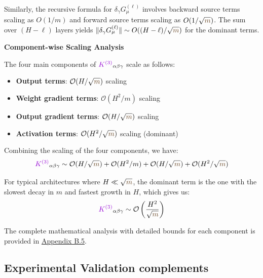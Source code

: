\documentclass[a4paper]{article}
\newcommand{\m}{\textcolor{weightcolor}{m}}
\theoremstyle{plain}
\theoremstyle{definition}
\theoremstyle{remark}
\begin{document}
Similarly, the recursive formula for $\delta_\gamma G^{(\ell)}_\mu$ involves backward source terms scaling as $O(1/m)$ and forward source terms scaling as $O(1/\sqrt{\m})$. The sum over $(H-\ell)$ layers yields $\|\delta_\gamma G^{(\ell)}_\mu\| \sim O((H-\ell)/\sqrt{\m})$ for the dominant terms.

\textbf{Component-wise Scaling Analysis}

The four main components of $\textcolor{k3color}{K^{(3)}}_{\alpha\beta\gamma}$ scale as follows:
\begin{itemize}
\item \textbf{Output terms}: $\mathcal{O}(H/\sqrt{\m})$ scaling
\item \textbf{Weight gradient terms}: $\mathcal{O}(H^2/m)$ scaling  
\item \textbf{Output gradient terms}: $\mathcal{O}(H/\sqrt{\m})$ scaling
\item \textbf{Activation terms}: $\mathcal{O}(H^2/\sqrt{\m})$ scaling (dominant)
\end{itemize}

Combining the scaling of the four components, we have:
\begin{equation}
\label{eq:combined_scaling}
\textcolor{k3color}{K^{(3)}}_{\alpha\beta\gamma} \sim \mathcal{O}(H/\sqrt{\m}) + \mathcal{O}(H^2/m) + \mathcal{O}(H/\sqrt{\m}) + \mathcal{O}(H^2/\sqrt{\m})
\end{equation}

For typical architectures where $H \ll \sqrt{\m}$, the dominant term is the one with the slowest decay in $m$ and fastest growth in $H$, which gives us:
\begin{equation}
\label{eq:k3_final_scaling}
    \textcolor{k3color}{K^{(3)}}_{\alpha\beta\gamma} \sim \mathcal{O}\left(\frac{H^2}{\sqrt{\m}}\right)
\end{equation}

The complete mathematical analysis with detailed bounds for each component is provided in \hyperref[sec:appendix_scaling_analysis]{Appendix B.5}.







\subsection{Experimental Validation complements}
\end{document}
